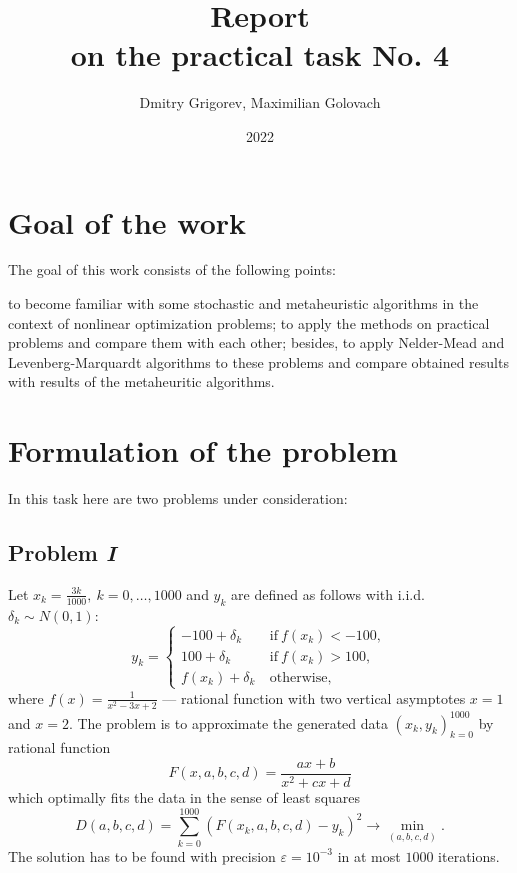 \documentclass[12pt, bachelor, substylefile = algo_title.rtx]{disser}
\newcommand{\eps}{\varepsilon}
\theoremstyle{definition}
\begin{document}
\title{Report\\
on the practical task No. 4}


\author{Dmitry Grigorev, Maximilian Golovach}
\sastatus {}

\date{2022}

\maketitle
\section{Goal of the work}
The goal of this work consists of the following points:
\begin{outline}
\1 to become familiar with some stochastic and metaheuristic algorithms in the context of nonlinear optimization problems;
\1 to apply the methods on practical problems and compare them with each other;
\1 besides, to apply Nelder-Mead and Levenberg-Marquardt algorithms to these problems and compare obtained results with results of the metaheuritic algorithms.
\end{outline}

\section{Formulation of the problem}
\label{sec: probsetup}
In this task here are two problems under consideration:
\subsection{Problem \textit{I}}
Let $x_k = \frac{3k}{1000},\ k = 0, \dots, 1000$ and $y_k$ are defined as follows with i.i.d. $\delta_k \sim N(0, 1)$:
\[ y_k = \left.
\begin{cases}
-100+\delta_k &\ \text{if}\ f(x_k) < -100,\\
100+\delta_k &\ \text{if}\ f(x_k) > 100,\\
f(x_k)+\delta_k &\ \text{otherwise},
\end{cases} \right.\]
where $f(x) = \frac{1}{x^2-3x+2}$ --- rational function with two vertical asymptotes $x = 1$ and $x = 2$. The problem is to approximate the generated data $(x_k, y_k)_{k = 0}^{1000}$ by rational function 
\[ F(x, a, b, c, d) = \frac{ax+b}{x^2+cx+d} \]
which optimally fits the data in the sense of least squares
\[ D(a, b, c, d) = \sum_{k=0}^{1000} (F(x_k, a, b, c, d) - y_k)^2 \to \min_{(a, b, c ,d)}. \]
The solution has to be found with precision $\eps  = 10^{-3}$ in at most $1000$ iterations. 
\end{document}

